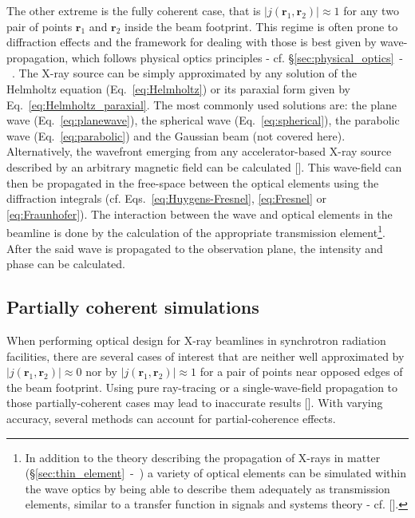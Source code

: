 \begin{refsection}
The other extreme is the fully coherent case, that is $|j(\textbf{r}_1,\textbf{r}_2)|\approx1$ for any two pair of points $\textbf{r}_1$ and $\textbf{r}_2$ inside the beam footprint. This regime is often prone to diffraction effects and the framework for dealing with those is best given by wave-propagation, which follows physical optics principles - cf. §\ref{sec:physical_optics}~-~\textit{}. The X-ray source can be simply approximated by any solution of the Helmholtz equation (Eq.~\ref{eq:Helmholtz}) or its paraxial form given by Eq.~\ref{eq:Helmholtz_paraxial}. The most commonly used solutions are: the plane wave (Eq.~\ref{eq:planewave}), the spherical wave (Eq.~\ref{eq:spherical}), the parabolic wave (Eq.~\ref{eq:parabolic}) and the Gaussian beam (not covered here). Alternatively, the wavefront emerging from any accelerator-based X-ray source described by an arbitrary magnetic field can be calculated [\cite{Chubar1995, Chubar2001}]. This wave-field can then be propagated in the free-space between the optical elements using the diffraction integrals (cf. Eqs.~\ref{eq:Huygens-Fresnel},  \ref{eq:Fresnel} or \ref{eq:Fraunhofer}). The interaction between the wave and optical elements in the beamline is done by the calculation of the appropriate transmission element\footnote{In addition to the theory describing the propagation of X-rays in matter (§\ref{sec:thin_element}~-~\textit{}) a variety of optical elements can be simulated within the wave optics by being able to describe them adequately as transmission elements, similar to a transfer function in signals and systems theory - cf. [\cite{Canestrari2014, Li2017}].}. After the said wave is propagated to the observation plane, the intensity and phase can be calculated. 

\subsection{Partially coherent simulations}\label{sec:partially_coherent}

When performing optical design for X-ray beamlines in synchrotron radiation facilities, there are several cases of interest that are neither well approximated by $|j(\textbf{r}_1,\textbf{r}_2)|\approx0$ nor by $|j(\textbf{r}_1,\textbf{r}_2)|\approx1$ for a pair of points near opposed edges of the beam footprint. Using pure ray-tracing or a single-wave-field propagation to those partially-coherent cases may lead to inaccurate results [\cite{SanchezdelRio2019}]. With varying accuracy, several methods can account for  partial-coherence effects.


\end{refsection}
